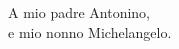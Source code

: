 \chapter*{}

\begin{flushright}
A mio padre Antonino, \\
	
e mio nonno Michelangelo.
\end{flushright}